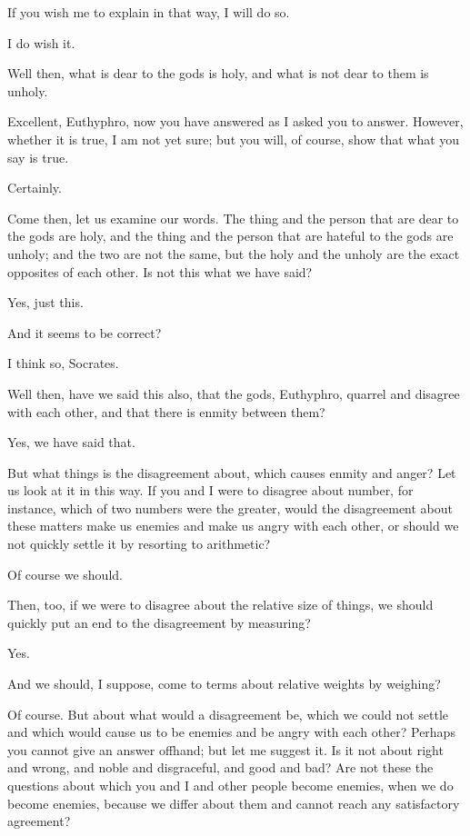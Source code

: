 \documentclass[letterpaper,12pt]{article}
\newcommand{\stephpag}[1]{\marginnote{\small\itshape\fontfamily{ppl}\selectfont #1}}
\begin{document}
\begin{drama}
\euthyphrospeaks
If you wish me to explain in that way, I will do so.

\socratesspeaks
I do wish it.

\euthyphrospeaks
Well then, what is dear to the gods is holy, \stephpag{7 a} and what is not dear to them is unholy.

\socratesspeaks
Excellent, Euthyphro, now you have answered as I asked you to answer. However, whether it is true, I am not yet sure; but you will, of course, show that what you say is true.

\euthyphrospeaks
Certainly.

\socratesspeaks
Come then, let us examine our words. The thing and the person that are dear to the gods are holy, and the thing and the person that are hateful to the gods are unholy; and the two are not the same, but the holy and the unholy are the exact opposites of each other. Is not this what we have said?

\euthyphrospeaks
Yes, just this.

\socratesspeaks
And it seems to be correct? \stephpag{b}

\euthyphrospeaks
I think so, Socrates.

\socratesspeaks
Well then, have we said this also, that the gods, Euthyphro, quarrel and disagree with each other, and that there is enmity between them?

\euthyphrospeaks
Yes, we have said that.

\socratesspeaks
But what things is the disagreement about, which causes enmity and anger? Let us look at it in this way. If you and I were to disagree about number, for instance, which of two numbers were the greater, would the disagreement about these matters make us enemies and make us angry with each other, or should we not quickly settle it by resorting \stephpag{c} to arithmetic?

\euthyphrospeaks
Of course we should.

\socratesspeaks
Then, too, if we were to disagree about the relative size of things, we should quickly put an end to the disagreement by measuring?

\euthyphrospeaks
Yes.

\socratesspeaks
And we should, I suppose, come to terms about relative weights by weighing?

\euthyphrospeaks
Of course.
\clearpage
\socratesspeaks
But about what would a disagreement be, which we could not settle and which would cause us to be enemies and be angry with each other? Perhaps you cannot give an answer offhand; \stephpag{d} but let me suggest it. Is it not about right and wrong, and noble and disgraceful, and good and bad? Are not these the questions about which you and I and other people become enemies, when we do become enemies, because we differ about them and cannot reach any satisfactory agreement?


\end{drama}
\end{document}
